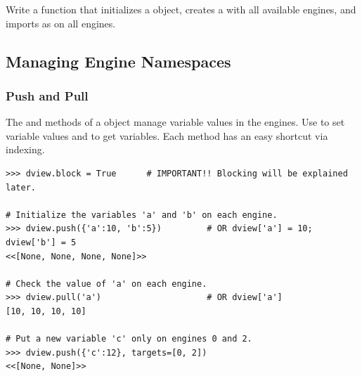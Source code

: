 \begin{problem} %
Write a function that initializes a  object, creates a  with all available engines, and imports  as  on all engines.
\end{problem}


\subsection*{Managing Engine Namespaces} %

\subsubsection*{Push and Pull} %

The  and  methods of a  object manage variable values in the engines.
Use  to set variable values and  to get variables.
Each method has an easy shortcut via indexing.

\begin{lstlisting}
>>> dview.block = True      # IMPORTANT!! Blocking will be explained later.

# Initialize the variables 'a' and 'b' on each engine.
>>> dview.push({'a':10, 'b':5})         # OR dview['a'] = 10; dview['b'] = 5
<<[None, None, None, None]>>

# Check the value of 'a' on each engine.
>>> dview.pull('a')                     # OR dview['a']
[10, 10, 10, 10]

# Put a new variable 'c' only on engines 0 and 2.
>>> dview.push({'c':12}, targets=[0, 2])
<<[None, None]>>
\end{lstlisting}

%

